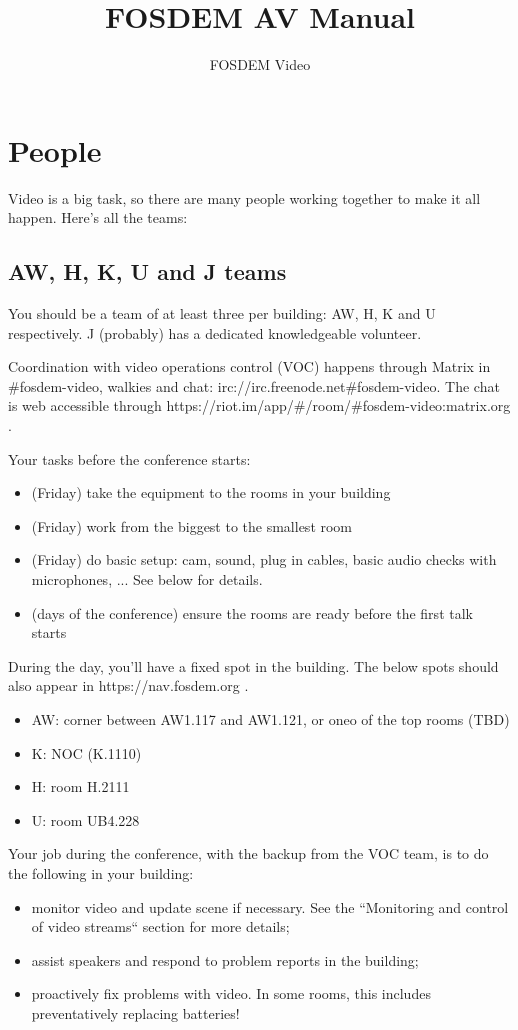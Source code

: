 \documentclass{article}
\title{FOSDEM AV Manual}
\author{FOSDEM Video}
\begin{document}
\maketitle \thispagestyle{empty}
\newpage

\tableofcontents
\newpage

\section{People}
Video is a big task, so there are many people working together to make it all happen. Here's all the teams:

\subsection{AW, H, K, U and J teams}
You should be a team of at least three per building: AW, H, K and U respectively. J (probably) has a dedicated knowledgeable volunteer.

Coordination with video operations control (VOC) happens through Matrix in \#fosdem-video, walkies and chat: irc://irc.freenode.net\#fosdem-video. The chat is web accessible through https://riot.im/app/\#/room/\#fosdem-video:matrix.org .

Your tasks before the conference starts:
\begin{itemize}
  \item (Friday) take the equipment to the rooms in your building
  \item (Friday) work from the biggest to the smallest room
  \item (Friday) do basic setup: cam, sound, plug in cables, basic audio checks with microphones, ... See below for details.
  \item (days of the conference) ensure the rooms are ready before the first talk starts
\end{itemize}

During the day, you'll have a fixed spot in the building. The below spots should also appear in https://nav.fosdem.org .
\begin{itemize}
  \item AW: corner between AW1.117 and AW1.121, or oneo of the top rooms (TBD)
  \item K: NOC (K.1110)
  \item H: room H.2111
  \item U: room UB4.228 
\end{itemize}

Your job during the conference, with the backup from the VOC team, is to do the following in your building:
\begin{itemize}
  \item monitor video and update scene if necessary. See the ``Monitoring and control of video streams`` section for more details;
  \item assist speakers and respond to problem reports in the building;
  \item proactively fix problems with video. In some rooms, this includes preventatively replacing batteries!
\end{itemize}
\end{document}
